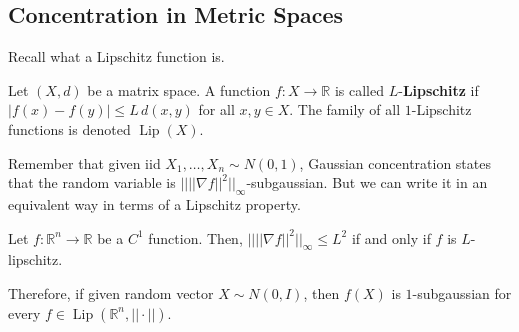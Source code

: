 \documentclass{article}
\DeclareMathOperator{\Lip}{Lip}
\begin{document}
  \subsection{Concentration in Metric Spaces}

  Recall what a Lipschitz function is. 

  \begin{definition}
  Let $(X, d)$ be a matrix space. A function $f: X \rightarrow \mathbb{R}$ is called $L$-\textbf{Lipschitz} if $|f(x) - f(y)| \leq L \, d(x, y)$ for all $x, y \in X$. The family of all $1$-Lipschitz functions is denoted $\Lip(X)$. 
  \end{definition}

  Remember that given iid $X_1, \ldots, X_n \sim N(0, 1)$, Gaussian concentration states that the random variable is $|| ||\nabla f||^2 ||_\infty$-subgaussian. But we can write it in an equivalent way in terms of a Lipschitz property. 

  \begin{lemma}
  Let $f: \mathbb{R}^n \rightarrow \mathbb{R}$ be a $C^1$ function. Then, $|| ||\nabla f||^2 ||_\infty \leq L^2$ if and only if $f$ is $L$-lipschitz. 
  \end{lemma}

  Therefore, if given random vector $X \sim N(0, I)$, then $f(X)$ is $1$-subgaussian for every $f \in \Lip(\mathbb{R}^n, ||\cdot||)$. 
\end{document}
